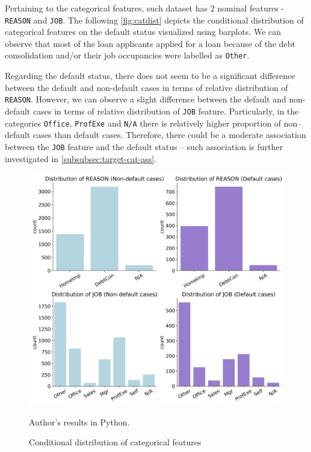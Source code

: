 Pertaining to the categorical features, such dataset has 2 nominal features - \texttt{REASON} and \texttt{JOB}. The following \autoref{fig:catdist} depicts the conditional distribution of categorical features on the default status visualized using barplots.
We can observe that most of the loan applicants applied for a loan because of the debt consolidation and/or their job occupancies were labelled as \texttt{Other}.

Regarding the default status, there does not seem to be a significant difference between the default and non-default cases in terms of relative distribution of \texttt{REASON}.
However, we can observe a slight difference between the default and non-default cases in terms of relative distribution of \texttt{JOB} feature. Particularly, in the categories \texttt{Office}, \texttt{ProfExe} and \texttt{N/A} there is relatively higher proportion of non--default cases than default cases. Therefore, there could be a moderate association between the \texttt{JOB} feature and the default status -- such association is further investigated in \autoref{subsubsec:target-cat-ass}.

\begin{figure}[H]
    \begin{center}
    \caption{Conditional distribution of categorical features}
    \label{fig:catdist}
    \includegraphics[width=140mm]{Figures/Categorical_Features_Distribution.jpg}
\end{center}
\begin{center}
    \begin{source}Author's results in Python.\end{source}
    \end{center}
\end{figure}


